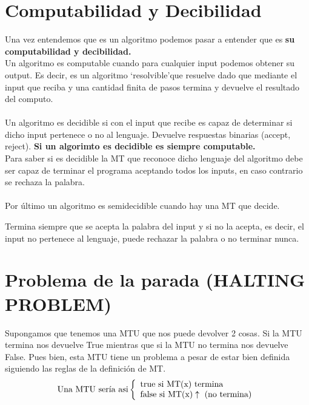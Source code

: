 \documentclass{article}
\begin{document}
\section{Computabilidad y Decibilidad}

Una vez entendemos que es un algoritmo podemos pasar a entender que
es \textbf{su computabilidad y decibilidad.}\\

Un algoritmo es computable cuando para cualquier input podemos obtener
su output. Es decir, es un algoritmo \lq resolvible\rq \space que resuelve dado que
mediante el input que reciba y una cantidad finita de pasos termina y
devuelve el resultado del computo.\\\\

Un algoritmo es decidible si con el input que recibe es capaz de
determinar si dicho input pertenece o no al lenguaje. Devuelve
respuestas binarias (accept, reject). \textbf{Si un algorimto es
decidible es siempre computable.}\\

Para saber si es decidible la MT que reconoce dicho lenguaje del
algoritmo debe ser capaz de terminar el programa aceptando todos los
inputs, en caso contrario se rechaza la palabra.\\\\

Por último un algoritmo es semidecidible cuando hay una MT que decide.

Termina siempre que se acepta la palabra del input y si no la acepta,
es decir, el input no pertenece al lenguaje, puede rechazar la palabra
o no terminar nunca.

\newpage

\section{Problema de la parada (HALTING PROBLEM)}

Supongamos que tenemos una MTU que nos puede devolver 2 cosas. Si la MTU termina
nos devuelve True mientras que si la MTU no termina nos devuelve False. Pues bien,
esta MTU tiene un  problema a pesar de estar bien definida siguiendo las reglas
de la definición de MT.\\

\[
\text{Una MTU sería asi}
\left\{
    \begin{array}{l}
        $true$ \text{ si MT(x) termina}\\
        $false$ \text{ si MT(x)} \uparrow \text{ (no termina)}
    \end{array}
\right.
\]
\end{document}

